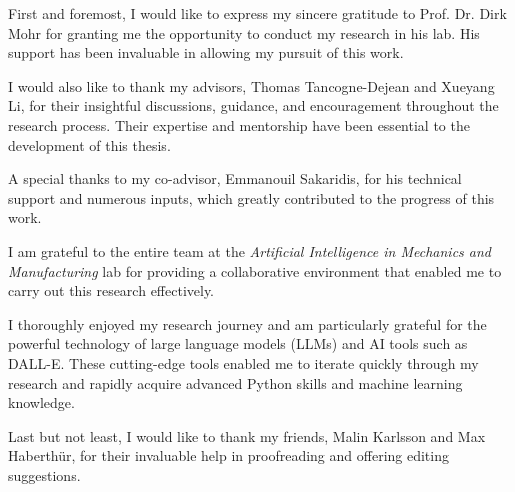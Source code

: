 First and foremost, I would like to express my sincere gratitude to Prof. Dr. Dirk Mohr for granting me the opportunity to conduct my research in his lab. His support has been invaluable in allowing my pursuit of this work.

I would also like to thank my advisors, Thomas Tancogne-Dejean and Xueyang Li, for their insightful discussions, guidance, and encouragement throughout the research process. Their expertise and mentorship have been essential to the development of this thesis.

A special thanks to my co-advisor, Emmanouil Sakaridis, for his technical support and numerous inputs, which greatly contributed to the progress of this work.

I am grateful to the entire team at the \textit{Artificial Intelligence in Mechanics and Manufacturing} lab for providing a collaborative environment that enabled me to carry out this research effectively.

I thoroughly enjoyed my research journey and am particularly grateful for the powerful technology of large language models (LLMs) and AI tools such as DALL-E. These cutting-edge tools enabled me to iterate quickly through my research and rapidly acquire advanced Python skills and machine learning knowledge.

Last but not least, I would like to thank my friends, Malin Karlsson and Max Haberthür, for their invaluable help in proofreading and offering editing suggestions.